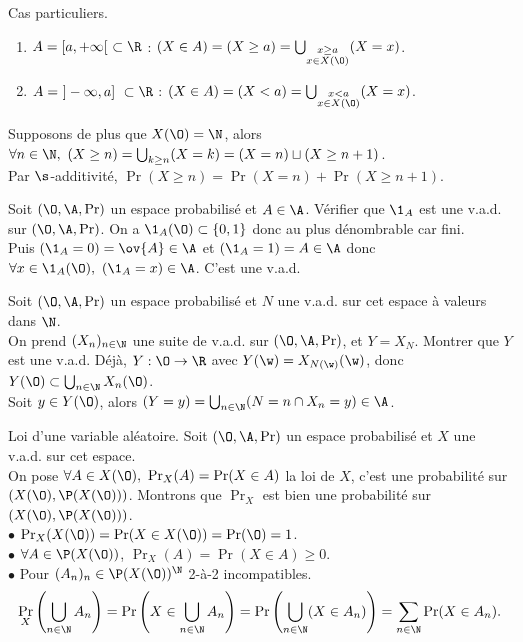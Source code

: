 \documentclass[11pt]{article}
\begin{document}
\begin{ex}{Cas particuliers.}{}
    \begin{enumerate}
        \item $A=[a,+\infty[~\subset\R$ : $(X\in A) = (X\geq a) = \bigcup_{\substack{x\geq a\\x\in X(\O)}}(X=x)$.
        \item $A=~]-\infty,a]~\subset\R$ : $(X \in A) = (X < a) = \bigcup_{\substack{x < a \\ x \in X(\O)}}(X=x)$. 
    \end{enumerate}
    Supposons de plus que $X(\O) = \N$, alors $\forall n \in \N, ~ (X\geq n) = \bigcup_{k\geq n}(X=k)=(X=n)\sqcup(X\geq n+1)$.\\
    Par $\s$-additivité, $\Pr(X\geq n) = \Pr(X=n)+\Pr(X\geq n+1)$.
\end{ex}

\pagebreak

\begin{ex}{}{}
    Soit $(\O,\A,\Pr)$ un espace probabilisé et $A\in\A$. Vérifier que $\1_A$ est une v.a.d. sur $(\O,\A,\Pr)$.
    \tcblower
    On a $\1_A(\O)\subset\{0,1\}$ donc au plus dénombrable car fini.\\
    Puis $(\1_A = 0) = \ov{A} \in \A$ et $(\1_A = 1) = A \in \A$ donc $\forall x \in \1_A(\O), ~ (\1_A = x) \in \A$. C'est une v.a.d. 
\end{ex}

\begin{exercice}{}{}
    Soit $(\O,\A,\Pr)$ un espace probabilisé et $N$ une v.a.d. sur cet espace à valeurs dans $\N$.\\
    On prend $(X_n)_{n\in\N}$ une suite de v.a.d. sur $(\O,\A,\Pr)$, et $Y=X_N$. Montrer que $Y$ est une v.a.d.
    \tcblower
    Déjà, $Y:\O\to\R$ avec $Y(\w)=X_{N(\w)}(\w)$, donc $Y(\O)\subset\bigcup_{n\in\N}X_n(\O)$.\\
    Soit $y\in Y(\O)$, alors $(Y = y) = \bigcup_{n\in\N}(N = n \cap X_n = y)\in\A$.
\end{exercice}

\begin{defi}{Loi d'une variable aléatoire.}{}
    Soit $(\O,\A,\Pr)$ un espace probabilisé et $X$ une v.a.d. sur cet espace.\\
    On pose $\forall A \in X(\O), ~ \Pr_X(A)=\Pr(X\in A)$ la loi de $X$, c'est une probabilité sur $(X(\O), \P(X(\O)))$.
    \tcblower
    Montrons que $\Pr_X$ est bien une probabilité sur $(X(\O), \P(X(\O)))$.\\
    $\bullet$ $\Pr_X(X(\O))=\Pr(X\in X(\O))=\Pr(\O)=1$.\\
    $\bullet$ $\forall A \in \P(X(\O))$, $\Pr_X(A)=\Pr(X\in A)\geq 0$.\\
    $\bullet$ Pour $(A_n)_n\in\P(X(\O))^\N$ 2-à-2 incompatibles.
    \begin{equation*}
        \Pr_X\left(\bigcup_{n\in\N}A_n\right) = \Pr\left(X\in\bigcup_{n\in\N}A_n\right) = \Pr\left(\bigcup_{n\in\N}(X\in A_n)\right) = \sum_{n\in\N}\Pr(X\in A_n).
    \end{equation*}
\end{defi}
\end{document}
